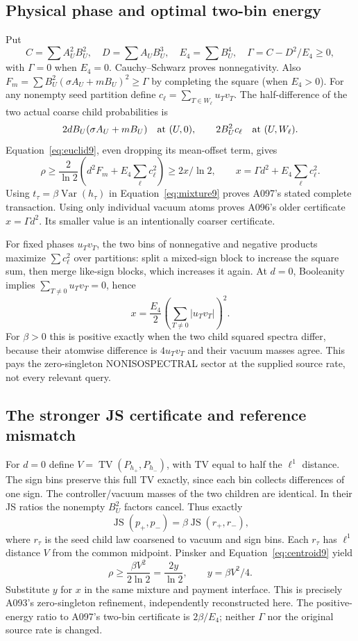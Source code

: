 \documentclass[11pt]{article}
\begin{document}
\subsection{Physical phase and optimal two-bin energy}
\label{sec:bins9}
Put
\[
C=\sum A_U^2B_U^2,\quad D=\sum A_UB_U^3,\quad
E_4=\sum B_U^4,\quad
\Gamma=C-D^2/E_4\ge0,
\]
with $\Gamma=0$ when $E_4=0$. Cauchy--Schwarz proves nonnegativity.
Also $F_m=\sum B_U^2(\sigma A_U+mB_U)^2\ge\Gamma$ by completing
the square (when $E_4>0$).
For any nonempty seed partition define $c_\ell=\sum_{T\in W_\ell}u_Tv_T$.
The half-difference of the two actual coarse child probabilities is
\[
2dB_U(\sigma A_U+mB_U)\quad\hbox{at }(U,0),\qquad
2B_U^2c_\ell\quad\hbox{at }(U,W_\ell).
\]
Equation~\eqref{eq:euclid9}, even dropping its mean-offset term, gives
\[
\rho\ge\frac{2}{\ln2}
\left(d^2F_m+E_4\sum_\ell c_\ell^2\right)
\ge2x/\ln2,\qquad
x=\Gamma d^2+E_4\sum_\ell c_\ell^2.
\tag{PE9}\label{eq:phase9}
\]
Using $t_\tau=\beta\operatorname{Var}(h_\tau)$ in
Equation~\eqref{eq:mixture9} proves A097's stated complete transaction.
Using only individual vacuum atoms proves A096's older certificate
$x=\Gamma d^2$. Its smaller value is an intentionally coarser certificate.

For fixed phases $u_Tv_T$, the two bins of nonnegative and negative
products maximize $\sum c_\ell^2$ over partitions: split a mixed-sign
block to increase the square sum, then merge like-sign blocks, which
increases it again. At $d=0$, Booleanity implies
$\sum_{T\ne0}u_Tv_T=0$, hence
\[
x=\frac{E_4}{2}\left(\sum_{T\ne0}|u_Tv_T|\right)^2.
\]
For $\beta>0$ this is positive exactly when the two child squared
spectra differ, because their atomwise difference is $4u_Tv_T$ and
their vacuum masses agree. This pays the zero-singleton NONISOSPECTRAL
sector at the supplied source rate, not every relevant query.

\subsection{The stronger JS certificate and reference mismatch}
\label{sec:js9}
For $d=0$ define $V=\operatorname{TV}(P_{h_+},P_{h_-})$,
with TV equal to half the $\ell^1$ distance. The sign bins preserve
this full TV exactly, since each bin collects differences of one sign.
The controller/vacuum masses of the two children are identical.
In their JS ratios the nonempty $B_U^2$ factors cancel. Thus exactly
\[
\operatorname{JS}(p_+,p_-)=\beta\operatorname{JS}(r_+,r_-),
\]
where $r_\tau$ is the seed child law coarsened to vacuum and sign bins.
Each $r_\tau$ has $\ell^1$ distance $V$ from the common midpoint.
Pinsker and Equation~\eqref{eq:centroid9} yield
\[
\rho\ge\frac{\beta V^2}{2\ln2}=\frac{2y}{\ln2},
\qquad y=\beta V^2/4.
\tag{PJ9}\label{eq:js9}
\]
Substitute $y$ for $x$ in the same mixture and payment interface.
This is precisely A093's zero-singleton refinement, independently
reconstructed here. The positive-energy ratio to A097's two-bin
certificate is $2\beta/E_4$; neither $\Gamma$ nor the original source
rate is changed.
\end{document}
